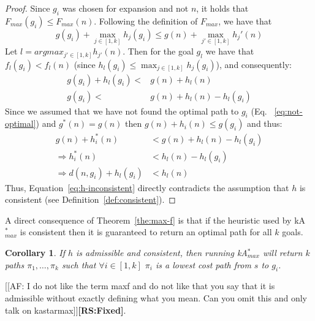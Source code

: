 \documentclass{aicom2e}
\newtheorem{corollary}{Corollary}
\newcommand{\kastarmax}{kA$^*_{max}$}
\newcommand{\roni}[1]{\textbf{[RS:#1]}}
\begin{document}
\begin{proof}
    Since $g_i$ was chosen for expansion and not $n$, it holds that $ F_{max}(g_i) \leq F_{max}(n) $.
    Following the definition of $F_{max}$, we have that
    \begin{equation}
    g(g_i) + \max_{j\in [1,k]} h_{j}(g_i) \leq g(n)+\max_{j'\in [1,k]} h_j'(n)
    \end{equation}
    Let $l=argmax_{j'\in [1,k]} h_{j'}(n)$.
    Then for the goal $g_l$ we have that
    $f_l(g_i) < f_l(n)$ (since $h_l(g_i) \leq \max_{j\in [1,k]} h_{j}(g_i)$), and consequently:
    \begin{align}
    g(g_i)+h_l(g_i) < & g(n)+h_l(n) \\
    g(g_i) < & g(n)+h_l(n) - h_l(g_i)
    \end{align}
    Since we assumed that we have not found the optimal path to $g_i$ (Eq.~ \ref{eq:not-optimal})
    and $g^*(n)=g(n)$ then
    $g(n)+h_i(n)\leq g(g_i)$ and thus:
    \begin{align}
    g(n)+h^*_i(n)  & < g(n)+h_l(n) - h_l(g_i)\\
    \Rightarrow h^*_i(n)  & < h_l(n) - h_l(g_i)\\
    \Rightarrow d(n,g_i) + h_l(g_i) & < h_l(n) \label{eq:h-inconsistent}
    \end{align}
    Thus, Equation~\ref{eq:h-inconsistent} directly contradicts the assumption
    that $h$ is consistent (see Definition~\ref{def:consistent}).
\end{proof}


A direct consequence of Theorem~\ref{the:max-f} is that
if the heuristic used by \kastarmax{} is consistent then
it is guaranteed to return an optimal path for all $k$ goals.

\begin{corollary}%
If $h$ is admissible and consistent, then running
\kastarmax{} will return $k$ paths $\pi_1,\ldots, \pi_k$ such that $\forall i\in[1,k]$ $\pi_i$ is a lowest cost path from $s$ to $g_i$. \label{cor:max-f}
\end{corollary}

[[AF: I do not like the term maxf and do not like that you say that it is
admissible without exactly defining what you mean. Can you omit this and only
talk on kastarmax]]\roni{Fixed}.
\end{document}
